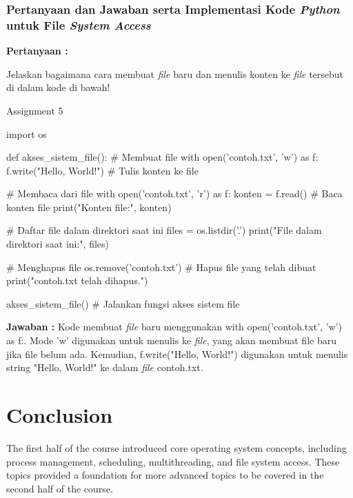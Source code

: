\documentclass[12pt]{article}
\begin{document}
\subsubsection{Pertanyaan dan Jawaban serta Implementasi Kode \textit{Python} untuk File\textit{ System Access}}

\textbf{Pertanyaan :}

\vspace{0.2cm}

Jelaskan bagaimana cara membuat \textit{file} baru dan menulis konten ke \textit{file} tersebut di dalam kode di bawah!

\vspace{0.2cm}

\begin{python}
Assignment 5

import os

def akses_sistem_file():
    # Membuat file
    with open('contoh.txt', 'w') as f:
        f.write("Hello, World!")  # Tulis konten ke file

    # Membaca dari file
    with open('contoh.txt', 'r') as f:
        konten = f.read()  # Baca konten file
        print("Konten file:", konten)

    # Daftar file dalam direktori saat ini
    files = os.listdir('.')
    print("File dalam direktori saat ini:", files)

    # Menghapus file
    os.remove('contoh.txt')  # Hapus file yang telah dibuat
    print("contoh.txt telah dihapus.")

akses_sistem_file()  # Jalankan fungsi akses sistem file
\end{python}

\textbf{Jawaban :} Kode membuat \textit{file} baru menggunakan with open('contoh.txt', 'w') as f:. Mode 'w' digunakan untuk menulis ke \textit{file}, yang akan membuat file baru jika file belum ada. Kemudian, f.write("Hello, World!") digunakan untuk menulis string "Hello, World!" ke dalam \textit{file} contoh.txt.

\section{Conclusion}
The first half of the course introduced core operating system concepts, including process management, scheduling, multithreading, and file system access. These topics provided a foundation for more advanced topics to be covered in the second half of the course.
\end{document}
